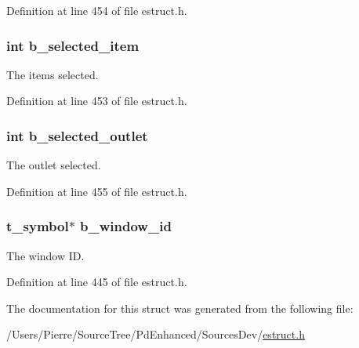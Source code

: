 Definition at line 454 of file estruct.\-h.

\hypertarget{struct__ebox_a1f65b6d093e53fd85bed085ce0c5dd8e}{
\subsubsection[{b\-\_\-selected\-\_\-item}]{\setlength{\rightskip}{0pt plus 5cm}int b\-\_\-selected\-\_\-item}}\label{struct__ebox_a1f65b6d093e53fd85bed085ce0c5dd8e}
The items selected. 

Definition at line 453 of file estruct.\-h.

\hypertarget{struct__ebox_acbf0482cb9c6e192e2059775acc1ac86}{
\subsubsection[{b\-\_\-selected\-\_\-outlet}]{\setlength{\rightskip}{0pt plus 5cm}int b\-\_\-selected\-\_\-outlet}}\label{struct__ebox_acbf0482cb9c6e192e2059775acc1ac86}
The outlet selected. 

Definition at line 455 of file estruct.\-h.

\hypertarget{struct__ebox_a7033df943e798c68e3a6117785c2d79e}{
\subsubsection[{b\-\_\-window\-\_\-id}]{\setlength{\rightskip}{0pt plus 5cm}t\-\_\-symbol$\ast$ b\-\_\-window\-\_\-id}}\label{struct__ebox_a7033df943e798c68e3a6117785c2d79e}
The window I\-D. 

Definition at line 445 of file estruct.\-h.



The documentation for this struct was generated from the following file\-:\begin{DoxyCompactItemize}
\item 
/\-Users/\-Pierre/\-Source\-Tree/\-Pd\-Enhanced/\-Sources\-Dev/\hyperlink{estruct_8h}{estruct.\-h}\end{DoxyCompactItemize}
